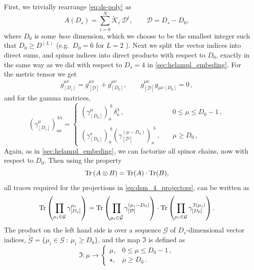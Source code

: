 First, we trivially rearrange \cref{eq:ds-poly} as
\begin{equation} \label{eq:ds-poly-alt}
  A(D_s) = \sum_{i=0}^{N} \tilde{\mathcal{K}}_i~\mathcal{D}^{i}, \qquad \mathcal{D} = D_s - D_0,
\end{equation}
where $D_0$ is some \textit{base} dimension, which we choose to be the smallest integer such that $ D_0 \geq D^{(L)} $ (e.g.\ $D_0=6$ for $L=2$ ).
Next we split the vector indices into direct sums, and spinor indices into direct products
with respect to $D_0$, exactly in the same way as we did with respect to $D_s=4$ in \cref{sec:helampl_embeding}.
For the metric tensor we get
\begin{align} \label{eq:ds-split-metric}
  g^{\mu\nu}_{[D_s]}  = g^{\mu\nu}_{[\mathcal{D}]} + g^{\mu\nu}_{[D_0]},  \qquad
  g^{\mu\nu}_{[\mathcal{D}]}g^{\phantom{\mu\nu}}_{\mu\nu\,[D_0]} = 0\,,
\end{align}
and for the gamma matrices,
\begin{equation} \label{eq:ds-gamma}
  (\gamma_{[D_s]}^\mu)_{a\kappa}^{\,b\lambda}  = \left\{ 
    \begin{array}{ll} 
      \left(\gamma_{[D_0]}^\mu\right)_a^{\;b} \,
      \delta_\kappa^\lambda\,, &\quad  0\le\mu \le D_0-1 \,,\\&\\
      \left(\gamma^\star_{[D_0]}\right)_a^{\;b} 
      \left(\gamma_{[\mathcal{D}]}^{(\mu-D_0)}\right)_\kappa^{\;\lambda}\,, 
      &\quad \mu \geq D_0 \,,
    \end{array}
    \right.
\end{equation}
Again, as in \cref{sec:helampl_embeding}, 
we can factorize all spinor chains, now with respect to $D_0$.
Then using the property
\[
  \Tr\qty(A \otimes B) = \Tr(A) \cdot \Tr(B),
\]
all traces required for the projections in \eqref{eq:dsm_4_projectors},
can be written as
\begin{equation} \label{eq:ds-split-traces}
  \Tr\left(\prod_{\mu_i\in \mathcal{G}}\gamma^{\mu_i}_{[D_s]}\right) =
  \Tr\left(\prod_{\mu_i\in \tilde{\mathcal{G}}}\gamma^{(\mu_i-D_0)}_{[\mathcal{D}]}\right) \cdot
  \Tr\left(\prod_{\mu_i\in \mathcal{G}}\gamma^{\mathfrak{I}(\mu_i)}_{[D_0]}\right).
\end{equation}
The product on the left hand side is over a sequence $\mathcal{G}$ of $D_s$-dimensional vector indices,
$\tilde{\mathcal{G}} = \{ \mu_i \in \mathcal{G} ~:~ \mu_i \geq D_0 \}$, and the map $\mathfrak{I}$ is defined as
\begin{equation}
  \mathfrak{I} : \mu \to
    \begin{cases}
      \mu, & 0\le\mu \le D_0-1\,, \\
      \star, & \mu \geq D_0\,.
    \end{cases}
\end{equation}
